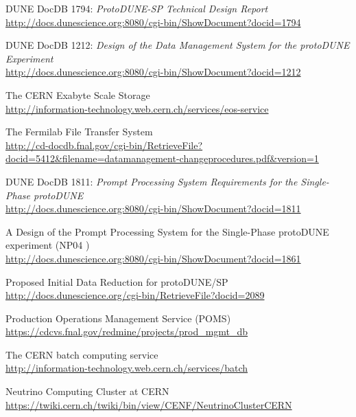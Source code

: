 \documentclass[pdftex,12pt,letter]{article}
\begin{document}
\begin{thebibliography}{1}

{DUNE DocDB 1794: \textit{ProtoDUNE-SP Technical Design Report }}\\
\url{http://docs.dunescience.org:8080/cgi-bin/ShowDocument?docid=1794}



{DUNE DocDB 1212: \textit{Design of the Data Management System for the protoDUNE Experiment}}\\
\url{http://docs.dunescience.org:8080/cgi-bin/ShowDocument?docid=1212}

{The CERN Exabyte Scale Storage}\\
\url{http://information-technology.web.cern.ch/services/eos-service}


{The Fermilab File Transfer System}\\
\url{http://cd-docdb.fnal.gov/cgi-bin/RetrieveFile?docid=5412&filename=datamanagement-changeprocedures.pdf&version=1}


{DUNE DocDB 1811: \textit{Prompt Processing System Requirements for the Single-Phase protoDUNE}}\\
\url{http://docs.dunescience.org:8080/cgi-bin/ShowDocument?docid=1811}

{A Design of the Prompt Processing System for the Single-Phase protoDUNE experiment (NP04 )}\\
\url{http://docs.dunescience.org:8080/cgi-bin/ShowDocument?docid=1861}

{Proposed Initial Data Reduction for protoDUNE/SP}\\
\url{http://docs.dunescience.org/cgi-bin/RetrieveFile?docid=2089}

{Production Operations Management Service (POMS)}\\
\url{https://cdcvs.fnal.gov/redmine/projects/prod_mgmt_db}


{The CERN batch computing service}\\
\url{http://information-technology.web.cern.ch/services/batch}



{Neutrino Computing Cluster at CERN}\\
\url{https://twiki.cern.ch/twiki/bin/view/CENF/NeutrinoClusterCERN}




\end{thebibliography}
\end{document}
